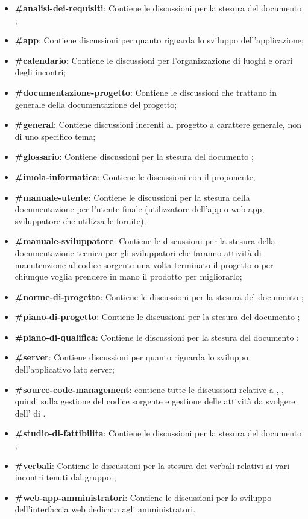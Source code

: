 \begin{itemize}
	\item \textbf{\#analisi-dei-requisiti}: Contiene le discussioni per la stesura del documento \AdR{};
	\item \textbf{\#app}: Contiene discussioni per quanto riguarda lo sviluppo dell'applicazione;
	\item \textbf{\#calendario}: Contiene le discussioni per l’organizzazione di luoghi e orari degli incontri;
	\item \textbf{\#documentazione-progetto}: Contiene le discussioni che trattano in generale della documentazione del progetto;
	\item \textbf{\#general}: Contiene discussioni inerenti al progetto a carattere generale, non di uno specifico tema;
	\item \textbf{\#glossario}: Contiene discussioni per la stesura del documento \Glossario{};
	\item \textbf{\#imola-informatica}: Contiene le discussioni con il proponente;
	\item \textbf{\#manuale-utente}: Contiene le discussioni per la stesura della documentazione per l'utente finale (utilizzatore dell'app o web-app, sviluppatore che utilizza le  fornite);
	\item \textbf{\#manuale-sviluppatore}: Contiene le discussioni per la stesura della documentazione tecnica per gli sviluppatori che faranno attività di manutenzione al codice sorgente una volta terminato il progetto o per chiunque voglia prendere in mano il prodotto per migliorarlo;
	\item \textbf{\#norme-di-progetto}: Contiene le discussioni per la stesura del documento \NdP{};
    \item \textbf{\#piano-di-progetto}: Contiene le discussioni per la stesura del documento \PdP{};
	\item \textbf{\#piano-di-qualifica}: Contiene le discussioni per la stesura del documento \PdQ{};
	\item \textbf{\#server}: Contiene discussioni per quanto riguarda lo sviluppo dell'applicativo lato server;
	\item \textbf{\#source-code-management}: contiene tutte le discussioni relative a , , quindi sulla gestione del codice sorgente e gestione delle attività da svolgere dell' di .
	\item \textbf{\#studio-di-fattibilita}: Contiene le discussioni per la stesura del documento \SdF{};
	\item \textbf{\#verbali}: Contiene le discussioni per la stesura dei verbali relativi ai vari incontri tenuti dal gruppo \Gruppo{};
	\item \textbf{\#web-app-amministratori}: Contiene le discussioni per lo sviluppo dell'interfaccia web dedicata agli amministratori.
\end{itemize}

